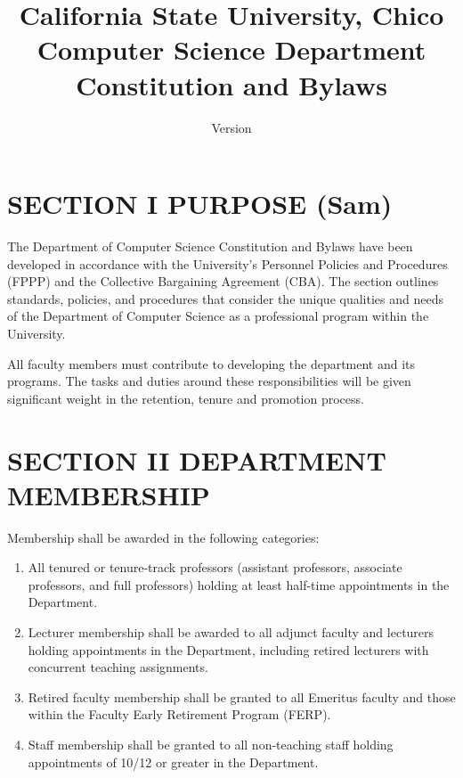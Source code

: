 \documentclass{scrartcl}
\title{California State University, Chico\\Computer Science Department\\Constitution and Bylaws}
\subtitle{Version \version}
\date{}
\begin{document}
\begin{titlepage}
\clearpage
\maketitle
\thispagestyle{empty}
\end{titlepage}

\tableofcontents
\clearpage

\section*{SECTION I PURPOSE (Sam)}
{}


The Department of Computer Science Constitution and Bylaws have been developed in accordance with the University’s Personnel Policies and Procedures (FPPP) and the Collective Bargaining Agreement (CBA). The section outlines standards, policies, and procedures that consider the unique qualities and needs of the Department of Computer Science as a professional program within the University.

All faculty members must contribute to developing the department and its programs. The tasks and duties around these responsibilities will be given significant weight in the retention, tenure and promotion process.

\section*{SECTION II DEPARTMENT MEMBERSHIP}
{}


Membership shall be awarded in the following categories:

\begin{enumerate}
\item All tenured or tenure-track professors (assistant professors, associate professors, and full professors) holding at least half-time appointments in the Department.
\item Lecturer membership shall be awarded to all adjunct faculty and lecturers holding appointments in the Department, including retired lecturers with concurrent teaching assignments.
\item Retired faculty membership shall be granted to all Emeritus faculty and those within the Faculty Early Retirement Program (FERP).
\item Staff membership shall be granted to all non-teaching staff holding appointments of 10/12 or greater in the Department.
\end{enumerate}
\end{document}

